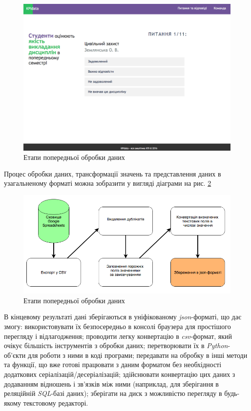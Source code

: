 \begin{figure}[h!]
  \includegraphics[width=\linewidth]{figures/poll_example.png}
  \caption{Етапи попередньої обробки даних}
  \label{fig:poll_example}
\end{figure}

Процес обробки даних, трансформації значень та представлення даних в узагальненому форматі можна зобразити у вигляді діаграми на рис. \ref{fig:data_processing}

\begin{figure}[h!]
  \includegraphics[width=\linewidth]{figures/data_processing.png}
  \caption{Етапи попередньої обробки даних}
  \label{fig:data_processing}
\end{figure}

В кінцевому результаті дані зберігаються в уніфікованому \textit{json}-форматі, що дає змогу: використовувати їх безпосередньо в консолі браузера для простішого перегляду і відлагодження; проводити легку конвертацію в \textit{csv}-формат, який очікує більшість інструментів з обробки даних; перетворювати їх в \textit{Python}-об'єкти для роботи з ними в коді програми; передавати на обробку в інші методи та функції, що вже готові працювати з даним форматом без необхідності додаткових серіалізацій/десеріалізацій; здійснювати конвертацію цих даних з додаванням відношень і зв'язків між ними (наприклад, для зберігання в реляційній \textit{SQL}-базі даних); зберігати на диск з можливістю перегляду в будь-якому текстовому редакторі.

